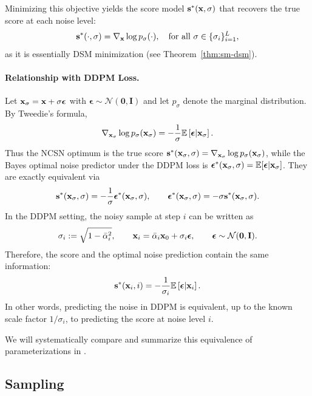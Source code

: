 Minimizing this objective yields the score model ${\mathbf{s}}^*({\mathbf{x}}, \sigma)$ that recovers the true score at each noise level:
\[
{\mathbf{s}}^*(\cdot, \sigma) = \nabla_{{\mathbf{x}}} \log p_\sigma(\cdot),  \quad \text{for all } \sigma \in \{\sigma_i\}_{i=1}^L,
\]
as it is essentially DSM minimization (see Theorem~\ref{thm:sm-dsm}).


\paragraph{Relationship with DDPM Loss.}
Let ${\mathbf{x}}_\sigma={\mathbf{x}}+\sigma\boldsymbol{\epsilon}$ with $\boldsymbol{\epsilon}\sim\mathcal{N}(\mathbf{0},\mathbf{I})$ and let $p_\sigma$ denote the  marginal distribution. By Tweedie’s formula,
\[
\nabla_{{\mathbf{x}}_\sigma}\log p_\sigma({\mathbf{x}}_\sigma)
= -\frac{1}{\sigma} \mathbb{E} \left[\boldsymbol{\epsilon} \middle|  {\mathbf{x}}_\sigma\right].
\]
Thus the NCSN optimum is the true score ${\mathbf{s}}^*({\mathbf{x}}_\sigma,\sigma)=\nabla_{{\mathbf{x}}_\sigma}\log p_\sigma({\mathbf{x}}_\sigma)$, while the Bayes optimal noise predictor under the DDPM loss  is $\boldsymbol{\epsilon}^*({\mathbf{x}}_\sigma,\sigma)=\mathbb{E}[\boldsymbol{\epsilon}|{\mathbf{x}}_\sigma]$. They are exactly equivalent via
\[
{\mathbf{s}}^*({\mathbf{x}}_\sigma,\sigma) = - \frac{1}{\sigma} \boldsymbol{\epsilon}^*({\mathbf{x}}_\sigma,\sigma),
\qquad
\boldsymbol{\epsilon}^*({\mathbf{x}}_\sigma,\sigma) = - \sigma {\mathbf{s}}^*({\mathbf{x}}_\sigma,\sigma).
\]
In the DDPM setting, the noisy sample at step $i$ can be written as
\[
\sigma_i:=\sqrt{1-\bar{\alpha}_i^2},
\qquad
{\mathbf{x}}_i
=
\bar{\alpha}_i{\mathbf{x}}_0+\sigma_i{\bm{\epsilon}},
\qquad
{\bm{\epsilon}}\sim\mathcal{N}(\bm{0},{\mathbf{I}}).
\]
Therefore, the score and the optimal noise prediction contain the same
information:
\[
{\mathbf{s}}^*({\mathbf{x}}_i,i)
=
-\frac{1}{\sigma_i}
\mathbb{E}\left[{\bm{\epsilon}}|{\mathbf{x}}_i\right].
\]
In other words, predicting the noise in DDPM is equivalent, up to the known
scale factor $1/\sigma_i$, to predicting the score at noise level $i$.

We will systematically compare and summarize this equivalence of parameterizations in .



\subsection{Sampling} 


